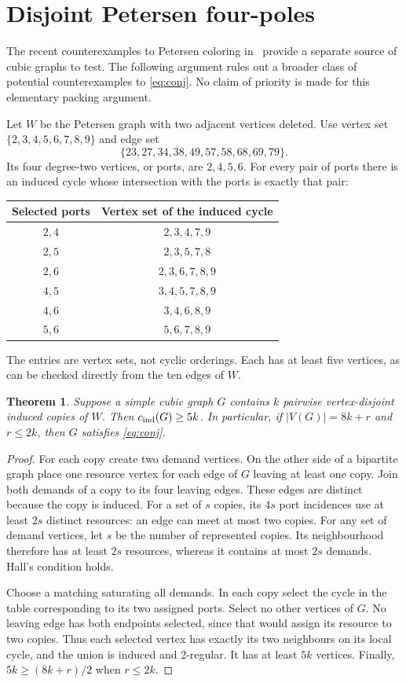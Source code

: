 \documentclass[11pt]{article}
\newtheorem{theorem}{Theorem}[section]
\begin{document}
\section{Disjoint Petersen four-poles}
\label{sec:petersen-poles}
The recent counterexamples to Petersen coloring in~\cite{GJMMMU}
provide a separate source of cubic graphs to test. The following
argument rules out a broader class of potential counterexamples to
\eqref{eq:conj}. No claim of priority is made for this elementary
packing argument.

Let $W$ be the Petersen graph with two adjacent vertices deleted.
Use vertex set $\{2,3,4,5,6,7,8,9\}$ and edge set
\[
 \{23,27,34,38,49,57,58,68,69,79\}.
\]
Its four degree-two vertices, or ports, are $2,4,5,6$.
For every pair of ports there is an induced cycle whose intersection
with the ports is exactly that pair:
\begin{center}
\begin{tabular}{cc}
\toprule
Selected ports & Vertex set of the induced cycle\\
\midrule
$2,4$ & $2,3,4,7,9$\\
$2,5$ & $2,3,5,7,8$\\
$2,6$ & $2,3,6,7,8,9$\\
$4,5$ & $3,4,5,7,8,9$\\
$4,6$ & $3,4,6,8,9$\\
$5,6$ & $5,6,7,8,9$\\
\bottomrule
\end{tabular}
\end{center}
The entries are vertex sets, not cyclic orderings. Each has at least
five vertices, as can be checked directly from the ten edges of $W$.

\begin{theorem}\label{thm:petersen-packing}
Suppose a simple cubic graph $G$ contains $k$ pairwise vertex-disjoint
induced copies of $W$. Then $c_{\rm ind}(G)\geq5k$. In particular,
if $|V(G)|=8k+r$ and $r\leq2k$, then $G$ satisfies
\eqref{eq:conj}.
\end{theorem}
\begin{proof}
For each copy create two demand vertices. On the other side of a
bipartite graph place one resource vertex for each edge of $G$
leaving at least one copy. Join both demands of a copy to its four
leaving edges. These edges are distinct because the copy is induced.
For a set of $s$ copies, its $4s$ port incidences use at least $2s$
distinct resources: an edge can meet at most two copies.
For any set of demand vertices, let $s$ be the number of represented
copies. Its neighbourhood therefore has at least $2s$ resources,
whereas it contains at most $2s$ demands. Hall's condition holds.

Choose a matching saturating all demands. In each copy select the
cycle in the table corresponding to its two assigned ports. Select
no other vertices of $G$. No leaving edge has both endpoints
selected, since that would assign its resource to two copies.
Thus each selected vertex has exactly its two neighbours on its
local cycle, and the union is induced and 2-regular. It has at least
$5k$ vertices. Finally, $5k\geq(8k+r)/2$ when $r\leq2k$.
\end{proof}
\end{document}

